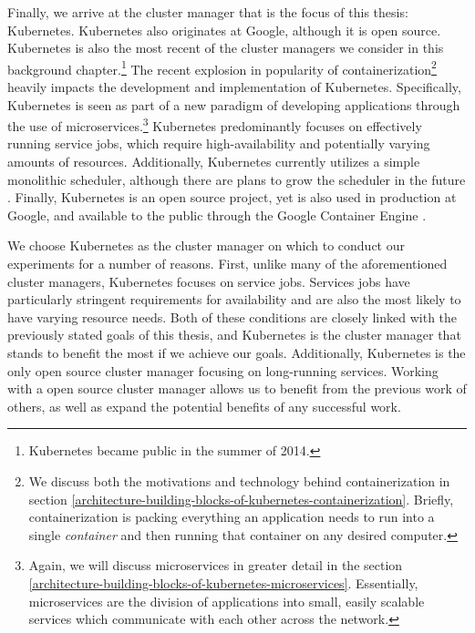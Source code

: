 Finally, we arrive at the cluster manager that is the focus of this thesis:
Kubernetes. Kubernetes also originates at Google, although it is open source.
Kubernetes is also the most
recent of the cluster managers we consider in this background chapter.\footnote{Kubernetes
became public in the summer of 2014.} The recent
explosion in popularity of containerization\footnote{We discuss both the motivations and
technology behind containerization in section
\ref{architecture-building-blocks-of-kubernetes-containerization}. Briefly, containerization is
packing everything an application needs to run into a single \textit{container}
and then running that container on any desired computer.}
heavily impacts the development and implementation of Kubernetes. Specifically,
Kubernetes is seen as part of a new paradigm of developing applications
through the use of microservices.\footnote{Again, we will
discuss microservices in greater detail
in the section \ref{architecture-building-blocks-of-kubernetes-microservices}.
Essentially, microservices are the division of applications
into small, easily scalable services which communicate with each other across
the network.} Kubernetes predominantly focuses on effectively running service
jobs, which require high-availability and potentially varying amounts of resources.
Additionally, Kubernetes currently utilizes a simple
monolithic scheduler, although
there are plans to grow the scheduler in the future \cite{k8s-design-overview}.
Finally, Kubernetes is an open source project, yet is also used in production at
Google, and available to the public through the Google Container
Engine \cite{google-container-engine}.

We choose Kubernetes as the cluster manager on which to conduct our experiments
for a number of reasons. First, unlike many of the aforementioned cluster
managers, Kubernetes focuses on service jobs. Services jobs
have particularly stringent requirements for availability and are also the most
likely to have varying resource needs. Both of these conditions are closely linked
with the previously stated goals of this thesis, and Kubernetes is the cluster
manager that stands to benefit the most if we achieve our goals. Additionally,
Kubernetes is the only open source cluster manager focusing on long-running
services. Working with a open source cluster manager allows us to benefit from
the previous work of others, as well as expand the potential benefits of any
successful work.
